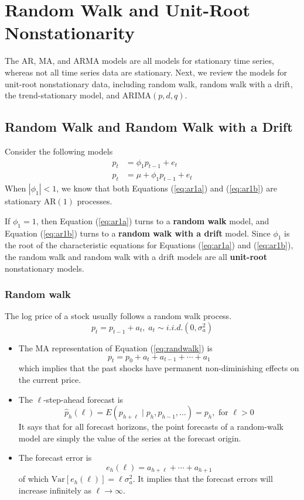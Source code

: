 \documentclass[a4paper,11pt]{article}
\newcommand{\var}{\mathrm{Var}}
\begin{document}
\section{Random Walk and Unit-Root Nonstationarity}
\label{sec:orgc78cfd0}

The AR, MA, and ARMA models are all models for stationary time series,
whereas not all time series data are stationary. Next, we review the
models for unit-root nonstationary data, including random walk, random
walk with a drift, the trend-stationary model, and \(\mathrm{ARIMA}(p, d, q)\).

\subsection{Random Walk and Random Walk with a Drift}
\label{sec:org112b9bc}

Consider the following models
\begin{align}
p_t &= \phi_1 p_{t-1} + e_t  \label{eq:ar1a} \\
p_t &= \mu + \phi_1 p_{t-1} + e_t \label{eq:ar1b}
\end{align}
When \(|\phi_1| < 1\), we know that both Equations (\ref{eq:ar1a}) and
(\ref{eq:ar1b}) are stationary \(\mathrm{AR}(1)\) processes.

If \(\phi_1 = 1\), then Equation (\ref{eq:ar1a}) turns to a \textbf{random
walk} model, and Equation (\ref{eq:ar1b}) turns to a \textbf{random walk with
a drift} model. Since \(\phi_1\) is the root of the characteristic
equations for Equations (\ref{eq:ar1a}) and (\ref{eq:ar1b}), the random
walk and random walk with a drift models are all \textbf{unit-root}
nonstationary models.

\subsubsection*{Random walk}
\label{sec:orgc293fb2}

The log price of a stock usually follows a random walk process.
\begin{equation}
\label{eq:randwalk}
p_t = p_{t-1} + a_t,\; a_t \sim i.i.d.(0, \sigma^2_a)
\end{equation}

\begin{itemize}
\item The MA representation of Equation (\ref{eq:randwalk}) is
\[ p_t = p_0 + a_t + a_{t-1} + \cdots + a_1 \]
which implies that the past shocks have permanent non-diminishing
effects on the current price.

\item The \(\ell\)-step-ahead forecast is
\[ \hat{p}_h(\ell) = E(p_{h+\ell} \mid p_h, p_{h-1}, \ldots) = p_h,
  \text{ for } \ell > 0 \]
It says that for all forecast horizons, the point forecasts of a
random-walk model are simply the value of the series at the forecast
origin.

\item The forecast error is
\[ e_h(\ell) = a_{h+\ell} + \cdots + a_{h+1} \]
of which \(\var[e_h(\ell)] = \ell \sigma^2_a\). It implies that the
forecast errors will increase infinitely as \(\ell \rightarrow \infty\).
\end{itemize}
\end{document}
